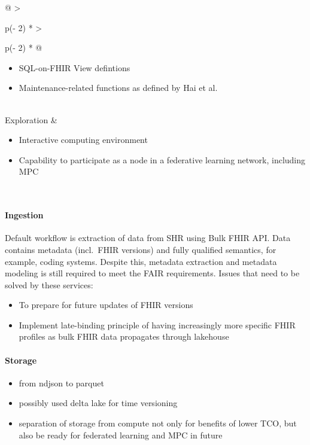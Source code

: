 \documentclass[
  authoryear]{elsarticle}
\let\oldparagraph\paragraph
\renewcommand{\paragraph}[1]{\oldparagraph{#1}\mbox{}}
\providecommand{\tightlist}{%
  \setlength{\itemsep}{0pt}\setlength{\parskip}{0pt}}\usepackage{longtable,booktabs,array}
\begin{document}
\begin{longtable}[]{@{}
  >{\raggedright\arraybackslash}p{(\columnwidth - 2\tabcolsep) * }
  >{\raggedright\arraybackslash}p{(\columnwidth - 2\tabcolsep) * }@{}}
\begin{minipage}[t]{\linewidth}
\begin{itemize}
\tightlist
\item
  SQL-on-FHIR View defintions
\item
  Maintenance-related functions as defined by Hai et al.
\end{itemize}
\end{minipage} \\
Exploration & \begin{minipage}[t]{\linewidth}\raggedright
\begin{itemize}
\tightlist
\item
  Interactive computing environment \citep{granger2021jupyter}
\item
  Capability to participate as a node in a federative learning network,
  including MPC
\end{itemize}
\end{minipage} \\
\end{longtable}

\paragraph{Ingestion}\label{ingestion}

Default workflow is extraction of data from SHR using Bulk FHIR API.
Data contains metadata (incl.~FHIR versions) and fully qualified
semantics, for example, coding systems. Despite this, metadata
extraction and metadata modeling is still required to meet the FAIR
requirements. Issues that need to be solved by these services:

\begin{itemize}
\tightlist
\item
  To prepare for future updates of FHIR versions
\item
  Implement late-binding principle of having increasingly more specific
  FHIR profiles as bulk FHIR data propagates through lakehouse
\end{itemize}

\paragraph{Storage}\label{storage}

\begin{itemize}
\tightlist
\item
  from ndjson to parquet
\item
  possibly used delta lake for time versioning
\item
  separation of storage from compute not only for benefits of lower TCO,
  but also be ready for federated learning and MPC in future
\end{itemize}
\end{document}

